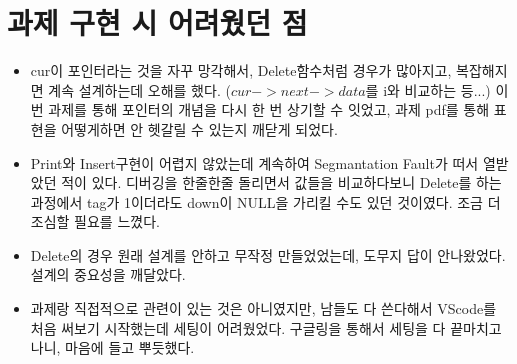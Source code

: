 \documentclass[a4paper,11pt]{article}
\begin{document}
\section{과제 구현 시 어려웠던 점}
\begin{itemize}
\item cur이 포인터라는 것을 자꾸 망각해서, Delete함수처럼 경우가 많아지고, 복잡해지면 계속 설계하는데 오해를 했다. ($cur->next->data$를 i와 비교하는 등...) 이번 과제를 통해 포인터의 개념을 다시 한 번 상기할 수 잇었고, 과제 pdf를 통해 표현을 어떻게하면 안 헷갈릴 수 있는지 깨닫게 되었다.
\item Print와 Insert구현이 어렵지 않았는데 계속하여 Segmantation Fault가 떠서 열받았던 적이 있다. 디버깅을 한줄한줄 돌리면서 값들을 비교하다보니 Delete를 하는 과정에서 tag가 1이더라도 down이 NULL을 가리킬 수도 있던 것이였다. 조금 더 조심할 필요를 느꼈다.
\item Delete의 경우 원래 설계를 안하고 무작정 만들었었는데, 도무지 답이 안나왔었다. 설계의 중요성을 깨달았다.
\item 과제랑 직접적으로 관련이 있는 것은 아니였지만, 남들도 다 쓴다해서 VScode를 처음 써보기 시작했는데 세팅이 어려웠었다. 구글링을 통해서 세팅을 다 끝마치고 나니, 마음에 들고 뿌듯했다.
\end{itemize}
\end{document}
